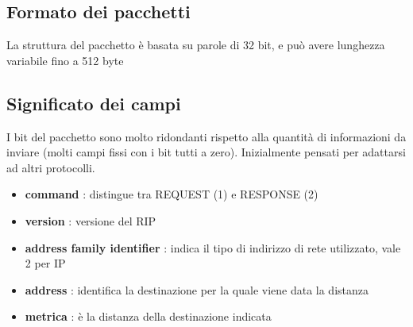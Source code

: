\documentclass{report}
\begin{document}
            \subsection{Formato dei pacchetti}
                La struttura del pacchetto è basata su parole di 32 bit, e può avere lunghezza variabile fino a 512 byte
            \subsection{Significato dei campi}
                I bit del pacchetto sono molto ridondanti rispetto alla quantità di informazioni da inviare (molti campi fissi con i bit tutti a zero).
                Inizialmente pensati per adattarsi ad altri protocolli.
                \\
                \begin{itemize}
                    \item \textbf{command} : distingue tra REQUEST (1) e RESPONSE (2)
                    \item \textbf{version} : versione del RIP
                    \item \textbf{address family identifier} : indica il tipo di indirizzo di rete utilizzato, vale 2 per IP
                    \item \textbf{address} : identifica la destinazione per la quale viene data la distanza
                    \item \textbf{metrica} : è la distanza della destinazione indicata
                \end{itemize}
\end{document}
